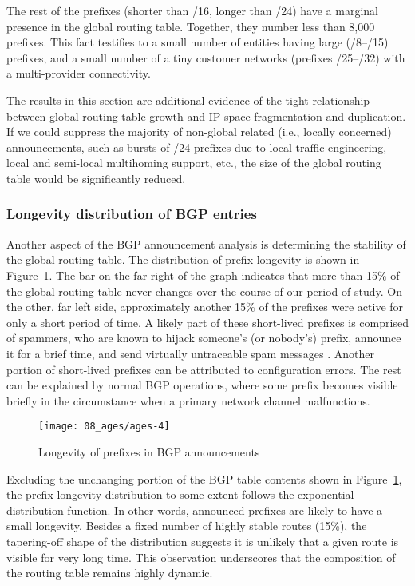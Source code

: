 The rest of the prefixes (shorter than /16, longer than /24) have a marginal
presence in the global routing table.  Together, they number less than 8,000
prefixes. This fact testifies to a small number of entities having large
(/8--/15) prefixes, and a small number of a tiny customer networks (prefixes
/25--/32) with a multi-provider connectivity.

The results in this section are additional evidence of the tight relationship
between global routing table growth and IP space fragmentation and duplication.
If we could suppress the majority of non-global related (i.e., locally
concerned) announcements, such as bursts of /24 prefixes due to local traffic
engineering, local and semi-local multihoming support, etc., the size of the
global routing table would be significantly reduced.

\subsubsection{Longevity distribution of BGP entries}

Another aspect of the BGP announcement analysis is determining the stability of
the global routing table. The distribution of prefix longevity is shown in
Figure~\ref{fig:bgp ages}. The bar on the far right of the graph indicates that
more than 15\% of the global routing table never changes over the course of our
period of study. On the other, far left side, approximately another 15\% of the
prefixes
 were active for only a short period of time. A likely part of these short-lived prefixes
is comprised of spammers, who are known to hijack someone's (or nobody's)
prefix, announce it for a brief time, and send virtually untraceable spam
messages \cite{Ramachandran:2006:Understanding-the-network-level}. Another
portion of short-lived prefixes can be attributed to configuration errors. The
rest can be explained by normal BGP operations, where some prefix becomes
visible briefly in the circumstance when a primary network channel
malfunctions.

\begin{figure}[htbp]
	\centering
		\texttt{[image: 08\_ages/ages-4]}
	\caption{Longevity of prefixes in BGP announcements}
	\label{fig:bgp ages}
\end{figure}

Excluding the unchanging portion of the BGP table contents shown in
Figure~\ref{fig:bgp ages}, the prefix longevity distribution to some extent
follows the exponential distribution function. In other words, announced
prefixes are likely to have a small longevity.  Besides a fixed number of
highly stable routes (15\%), the tapering-off shape of the distribution
suggests it is unlikely that a given route is visible for very long time. This
observation underscores that the composition of the routing table remains
highly dynamic.

